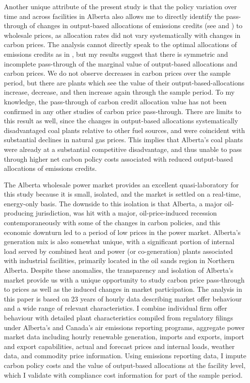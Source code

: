 \documentclass[12pt]{article}
\begin{document}
Another unique attribute of the present study is that the policy variation over time and across facilities in Alberta also allows me to directly identify the pass-through of changes in output-based allocations of emissions credits (see \cite{fischerfox07} and \cite{fischerfox12}) to wholesale prices, as allocation rates did not vary systematically with changes in carbon prices. The analysis cannot directly speak to the optimal allocations of emissions credits as in \cite{burtraw_palmer_2008}, but my results suggest that there is symmetric and incomplete pass-through of the marginal value of output-based allocations and carbon prices. We do not observe decreases in carbon prices over the sample period, but there are plants which see the value of their output-based-allocations increase, decrease, and then increase again through the sample period. To my knowledge, the pass-through of carbon credit allocation value has not been confirmed in any other studies of carbon price pass-through. There are limits to this result as well, since the changes in output-based allocations systematically disadvantaged coal plants relative to other fuel sources, and were coincident with substantial declines in natural gas prices. This implies that Alberta's coal plants were already at a substantial competitive disadvantage, and thus unable to pass through higher net carbon policy costs associated with reduced output-based allocations of emissions credits.

The Alberta wholesale power market provides an excellent quasi-laboratory for this study because it is small, isolated, and the market is settled on a real-time, energy-only basis. The downside to this isolation is that Alberta, a major oil-producing jurisdiction, was hit with a major, oil-price-induced recession contemporaneously with some of the changes in carbon policies, and this economic downturn led to a period of low prices in the power market. Alberta's generation mix is also somewhat unique, with a significant portion of internal load served by combined heat and power (or co-generation) plants associated with industrial facilities, primarily located in the oil sands region in Northern Alberta. Despite these anomalies, the transparency and isolation of Alberta's market provide us with a unique opportunity to study carbon price pass-through to prices as well as the induced changes in market participation. The analysis in this paper is based on 23 years of hourly data describing market offer behaviour and a wide range of relevant characteristics. I combine individual firm offer behaviour with detailed plant characteristics compiled from regulatory filings under Alberta's and Canada's air emissions reporting programs, aggregate power market data including hourly renewable generation, imports and exports, import and export capabilities, actual and forecast prices and internal loads, weather data, and commodity price information. Using emissions reporting data, I impute carbon policy costs and the value of output-based allocations at the facility level, which I validate with compliance cost information for part of the sample period.
\end{document}
